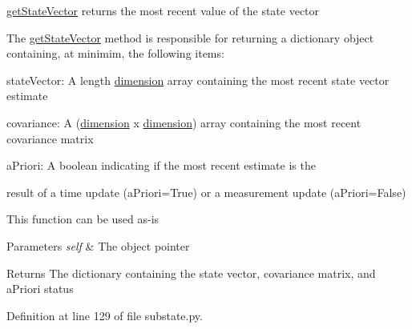 \hyperlink{classmodest_1_1substates_1_1substate_1_1SubState_aa18c8238415131b4b63cef0e4b2ff9fd}{get\+State\+Vector} returns the most recent value of the state vector 

The \hyperlink{classmodest_1_1substates_1_1substate_1_1SubState_aa18c8238415131b4b63cef0e4b2ff9fd}{get\+State\+Vector} method is responsible for returning a dictionary object containing, at minimim, the following items\+:


\begin{DoxyItemize}
\item \textquotesingle{}state\+Vector\textquotesingle{}\+: A length \hyperlink{classmodest_1_1substates_1_1substate_1_1SubState_ab9027f6d1d7d57c47731612f519b7ee6}{dimension} array containing the most recent state vector estimate
\item \textquotesingle{}covariance\textquotesingle{}\+: A (\hyperlink{classmodest_1_1substates_1_1substate_1_1SubState_ab9027f6d1d7d57c47731612f519b7ee6}{dimension} x \hyperlink{classmodest_1_1substates_1_1substate_1_1SubState_ab9027f6d1d7d57c47731612f519b7ee6}{dimension}) array containing the most recent covariance matrix
\item \textquotesingle{}a\+Priori\textquotesingle{}\+: A boolean indicating if the most recent estimate is the
\item result of a time update (a\+Priori=True) or a measurement update (a\+Priori=False)
\end{DoxyItemize}

This function can be used as-\/is


\begin{DoxyParams}{Parameters}
{\em self} & The object pointer\\
\hline
\end{DoxyParams}
\begin{DoxyReturn}{Returns}
The dictionary containing the state vector, covariance matrix, and a\+Priori status 
\end{DoxyReturn}


Definition at line 129 of file substate.\+py.

